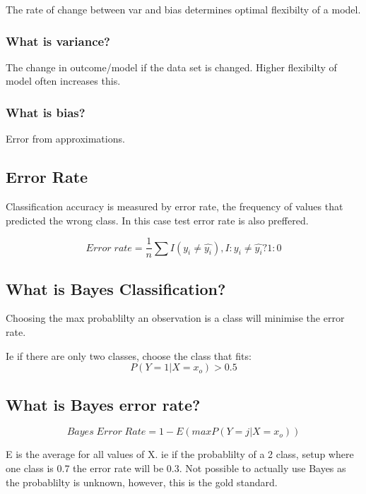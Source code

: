 \documentclass[11pt]{scrartcl} %
\begin{document}
The rate of change between var and bias determines optimal flexibilty of a model.

\subsubsection{What is variance?}

The change in outcome/model if the data set is changed. Higher flexibilty of model often increases
this.

\subsubsection{What is bias?}

Error from approximations.

\subsection{Error Rate}

Classification accuracy is measured by error rate, the frequency of values that predicted the wrong class. In this
case test error rate is also preffered.

\begin{equation}
	Error\; rate = \frac{1}{n} \sum{I(y_i \neq \hat{y_i})} , I: y_i \neq \hat{y_i} ? 1:0
\end{equation}

\subsection{What is Bayes Classification?}

Choosing the max probablilty an observation is a class will minimise the error rate.

Ie if there are only two classes, choose the class that fits:
\begin{equation}
	P(Y=1|X=x_o) > 0.5
\end{equation}

\subsection{What is Bayes error rate?}

\begin{equation}
	Bayes\; Error\; Rate = 1 - E(maxP(Y=j|X=x_o))
\end{equation}

E is the average for all values of X. ie if the probablilty of a 2 class, setup where one class is 0.7 the error rate
will be 0.3. Not possible to actually use Bayes as the probablilty is unknown, however, this is the gold standard.
\end{document}
